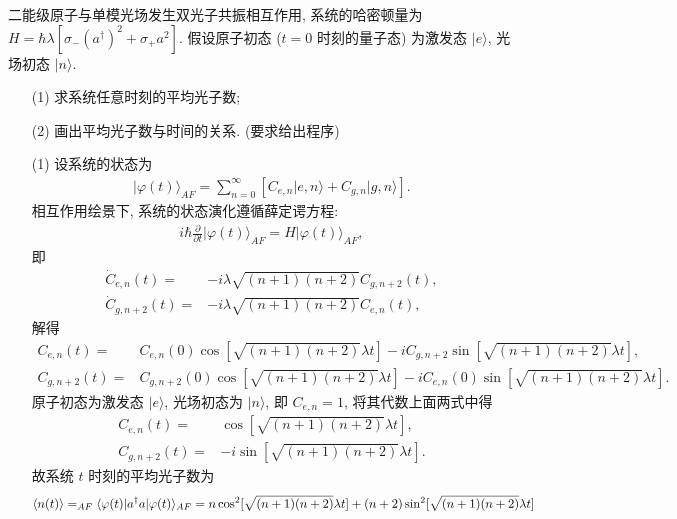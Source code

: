 \documentclass{assignment}
\begin{document}
\begin{prob}
    二能级原子与单模光场发生双光子共振相互作用, 系统的哈密顿量为 $H=\hbar\lambda[\sigma_-(a^{\dagger})^2+\sigma_+a^2]$. 假设原子初态 ($t=0$ 时刻的量子态) 为激发态 $\lvert e\rangle$, 光场初态 $\lvert n\rangle$.
    \begin{itemize}
        \item[(1)] 求系统任意时刻的平均光子数;
        \item[(2)] 画出平均光子数与时间的关系. (要求给出程序)
    \end{itemize}
\end{prob}
\begin{sol}
    \begin{itemize}
        \item[(1)] 设系统的状态为
        \begin{align}
            \lvert\varphi(t)\rangle_{AF}=\sum_{n=0}^{\infty}[C_{e,n}\lvert e,n\rangle+C_{g,n}\lvert g,n\rangle].
        \end{align}
        相互作用绘景下, 系统的状态演化遵循薛定谔方程:
        \begin{align}
            i\hbar\frac{\partial}{\partial t}\lvert\varphi(t)\rangle_{AF}=H\lvert\varphi(t)\rangle_{AF},
        \end{align}
        即
        \begin{align}
            \dot{C}_{e,n}(t)=&-i\lambda\sqrt{(n+1)(n+2)}C_{g,n+2}(t),\\
            \dot{C}_{g,n+2}(t)=&-i\lambda\sqrt{(n+1)(n+2)}C_{e,n}(t),
        \end{align}
        解得
        \begin{align}
            C_{e,n}(t)=&C_{e,n}(0)\cos[\sqrt{(n+1)(n+2)}\lambda t]-iC_{g,n+2}\sin[\sqrt{(n+1)(n+2)}\lambda t],\\
            C_{g,n+2}(t)=&C_{g,n+2}(0)\cos[\sqrt{(n+1)(n+2)}\lambda t]-iC_{e,n}(0)\sin[\sqrt{(n+1)(n+2)}\lambda t].
        \end{align}
        原子初态为激发态 $\lvert e\rangle$, 光场初态为 $\lvert n\rangle$, 即 $C_{e,n}=1$, 将其代数上面两式中得
        \begin{align}
            C_{e,n}(t)=&\cos[\sqrt{(n+1)(n+2)}\lambda t],\\
            C_{g,n+2}(t)=&-i\sin[\sqrt{(n+1)(n+2)}\lambda t].
        \end{align}
        故系统 $t$ 时刻的平均光子数为
        \begin{align}
            \notag\langle n(t)\rangle&=_{AF}\langle\varphi(t)\rvert a^{\dagger}a\lvert\varphi(t)\rangle_{AF}=n\cos^2[\sqrt{(n+1)(n+2)}\lambda t]+(n+2)\sin^2[\sqrt{(n+1)(n+2)}\lambda t]\\

\end{align}
\end{itemize}
\end{sol}
\end{document}
